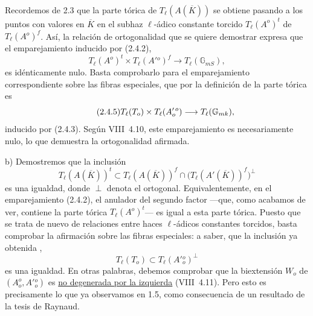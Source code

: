 Recordemos de 2.3 que la parte tórica de $T_\ell(A(\overline K))$ se
obtiene pasando a los puntos con valores en $\overline K$ en el subhaz
$\ell$-ádico constante torcido $T_\ell(A^o)^t$ de $T_\ell(A^o)^f$.
Así, la relación de ortogonalidad que se quiere demostrar expresa que
el emparejamiento inducido por (2.4.2),
\begin{equation}\tag{2.4.4}
 T_\ell(A^o)^t\times T_\ell(A'{}^o)^f
 \longrightarrow T_\ell(\mathbb G_{mS}),
\end{equation}
es idénticamente nulo. Basta comprobarlo para el emparejamiento
correspondiente sobre las fibras especiales, que por la definición de
la parte tórica es
\begin{equation}\tag{2.4.5}
 T_\ell(T_o)\times T_\ell(\sisi{A_o^{\,o}}{A_o^{\prime\,o}})
 \longrightarrow T_\ell(\mathbb G_{mk}),
\end{equation}
inducido por (2.4.3). Según VIII~4.10, este emparejamiento es
necesariamente nulo, lo que demuestra la ortogonalidad afirmada.

\smallskip
\noindent
b) Demostremos que la inclusión
\begin{equation}\tag{2.4.6}
 T_\ell(A(\overline K))^t\subset
 T_\ell(A(\overline K))^f\cap
 \bigl(T_\ell(A'(\overline K))^f\bigr)^\perp
\end{equation}
es una igualdad, donde $\perp$ denota el ortogonal. Equivalentemente,
en el emparejamiento (2.4.2), el anulador del segundo factor ---que,
como acabamos de ver, contiene la parte tórica $T_\ell(A^o)^t$--- es
igual a esta parte tórica. Puesto que se trata de nuevo de relaciones
entre haces $\ell$-ádicos constantes torcidos, basta comprobar la
afirmación sobre las fibras especiales: a saber, que la inclusión ya
obtenida ,
\begin{equation}\tag{2.4.7}
 T_\ell(T_o)\subset T_\ell(A'{}_o^o)^\perp
\end{equation}
es una igualdad. En otras
palabras, debemos comprobar que la biextensión $W_o$ de
$(A_o^o,A'{}_o^o)$ es \underline{no degenerada por la izquierda}
(VIII~4.11). Pero esto es precisamente lo que ya observamos en 1.5,
como consecuencia de un resultado de la tesis de Raynaud.
